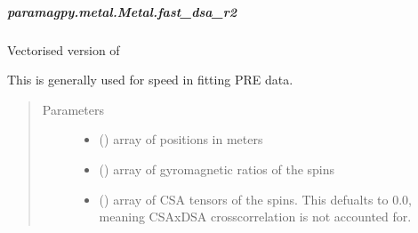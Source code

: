 \documentclass[a4paper,10pt,english,openany,oneside]{sphinxmanual}
\begin{document}
\begin{fulllineitems}
\begin{fulllineitems}
\begin{fulllineitems}
\end{fulllineitems}



\subparagraph{paramagpy.metal.Metal.fast\_dsa\_r2}
\label{\detokenize{reference/generated/paramagpy.metal.Metal.fast_dsa_r2:paramagpy-metal-metal-fast-dsa-r2}}\label{\detokenize{reference/generated/paramagpy.metal.Metal.fast_dsa_r2::doc}}

\begin{fulllineitems}
\label{\detokenize{reference/generated/paramagpy.metal.Metal.fast_dsa_r2:paramagpy.metal.Metal.fast_dsa_r2}}
Vectorised version of {\hyperref[\detokenize{reference/generated/paramagpy.metal.Metal.dsa_r2:paramagpy.metal.Metal.dsa_r2}]{}}

This is generally used for speed in fitting PRE data.
\begin{quote}\begin{description}
\item[{Parameters}] \leavevmode\begin{itemize}
\item {} 
 (\sphinxstyleliteralemphasis{\sphinxupquote{ (}}\sphinxstyleliteralemphasis{\sphinxupquote{,}}\sphinxstyleliteralemphasis{\sphinxupquote{)}}) \textendash{} array of positions in meters

\item {} 
 (\sphinxstyleliteralemphasis{\sphinxupquote{ (}}\sphinxstyleliteralemphasis{\sphinxupquote{,}}\sphinxstyleliteralemphasis{\sphinxupquote{)}}) \textendash{} array of gyromagnetic ratios of the spins

\item {} 
 (\sphinxstyleliteralemphasis{\sphinxupquote{ (}}\sphinxstyleliteralemphasis{\sphinxupquote{,}}\sphinxstyleliteralemphasis{\sphinxupquote{,}}\sphinxstyleliteralemphasis{\sphinxupquote{) }}\sphinxstyleliteralemphasis{\sphinxupquote{(}}\sphinxstyleliteralemphasis{\sphinxupquote{)}}) \textendash{} array of CSA tensors of the spins.
This defualts to 0.0, meaning CSAxDSA crosscorrelation is
not accounted for.


\end{itemize}
\end{description}
\end{quote}
\end{fulllineitems}
\end{fulllineitems}
\end{fulllineitems}
\end{document}
